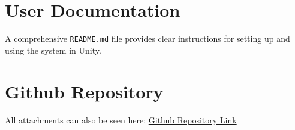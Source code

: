 \documentclass[12pt,a4paper]{report}
\begin{document}
\section{User Documentation}

A comprehensive \texttt{README.md} file provides clear instructions for setting up and using the system in Unity.

\section{Github Repository}
All attachments can also be seen here: \href{https://github.com/Olliewakeford/Procedural-Terrain-Generation-with-fixed-points}{Github Repository Link}
\end{document}
